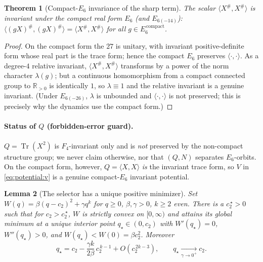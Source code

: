 \documentclass[11pt]{article}
\theoremstyle{plain}
\newtheorem{theorem}{Theorem}[section]
\newtheorem{lemma}[theorem]{Lemma}
\theoremstyle{definition}
\theoremstyle{remark}
\begin{document}
\begin{theorem}[Compact-$E_6$ invariance of the sharp term]
\label{thm:potential:T2}
The scalar $\langle X^\#,X^\#\rangle$ is invariant under the compact real form $E_6$ (and
$E_{6(-14)}$): \ $\langle(gX)^\#,(gX)^\#\rangle=\langle X^\#,X^\#\rangle$ for all
$g\in E_6^{\,\mathrm{compact}}$.
\end{theorem}

\begin{proof}
On the compact form the $27$ is unitary, with invariant positive-definite form whose real
part is the trace form; hence the compact $E_6$ preserves $\langle\cdot,\cdot\rangle$. As a
degree-$4$ relative invariant, $\langle X^\#,X^\#\rangle$ transforms by a power of the norm
character $\lambda(g)$; but a continuous homomorphism from a compact connected group to
$\mathbb R_{>0}$ is identically $1$, so $\lambda\equiv1$ and the relative invariant is a
genuine invariant. (Under $E_{6(-26)}$, $\lambda$ is unbounded and $\langle\cdot,\cdot\rangle$
is not preserved; this is precisely why the dynamics use the compact form.)
\end{proof}

\paragraph{Status of $Q$ (forbidden-error guard).}
$Q=\operatorname{Tr}(X^2)$ is $F_4$-invariant only and is \emph{not} preserved by the
non-compact structure group; we never claim otherwise, nor that $(Q,N)$ separates $E_6$-orbits.
On the compact form, however, $Q=\langle X,X\rangle$ \emph{is} the invariant trace form, so
$V$ in \eqref{eq:potential:v} is a genuine compact-$E_6$ invariant potential.

\begin{lemma}[The selector has a unique positive minimizer]
\label{lem:potential:L2}
Set $W(q)=\beta(q-c_2)^2+\gamma q^k$ for $q\ge0$, $\beta,\gamma>0$, $k\ge2$ even. There is a
$c_2^{\,\star}>0$ such that for $c_2>c_2^{\,\star}$, $W$ is strictly convex on $[0,\infty)$ and
attains its global minimum at a unique interior point $q_\star\in(0,c_2)$ with $W'(q_\star)=0$,
$W''(q_\star)>0$, and $W(q_\star)<W(0)=\beta c_2^2$. Moreover
\begin{equation}
\label{eq:potential:qstar}
q_\star=c_2-\frac{\gamma k}{2\beta}\,c_2^{\,k-1}+O(c_2^{\,2k-3}),
\qquad q_\star\xrightarrow[\gamma\to0^+]{}c_2.
\end{equation}
\end{lemma}
\end{document}
